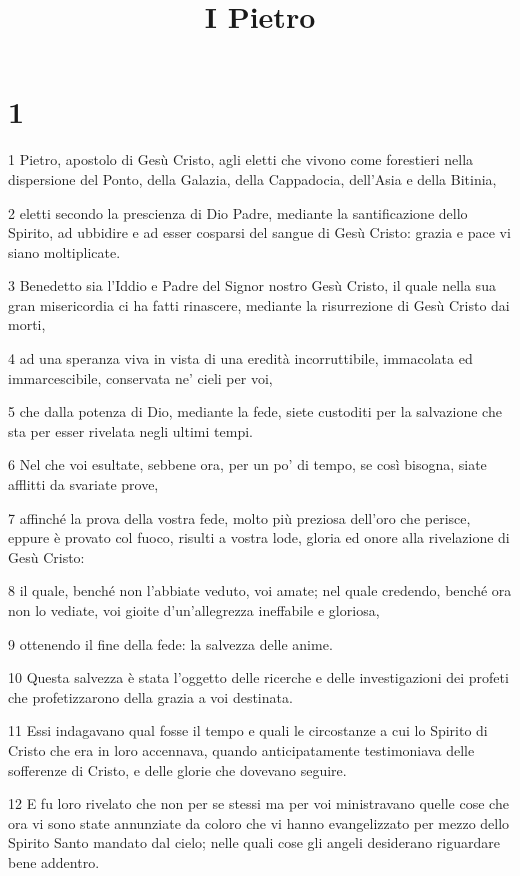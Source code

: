 

\title{I Pietro}


\chapter{1}

\par 1 Pietro, apostolo di Gesù Cristo, agli eletti che vivono come forestieri nella dispersione del Ponto, della Galazia, della Cappadocia, dell'Asia e della Bitinia,
\par 2 eletti secondo la prescienza di Dio Padre, mediante la santificazione dello Spirito, ad ubbidire e ad esser cosparsi del sangue di Gesù Cristo: grazia e pace vi siano moltiplicate.
\par 3 Benedetto sia l'Iddio e Padre del Signor nostro Gesù Cristo, il quale nella sua gran misericordia ci ha fatti rinascere, mediante la risurrezione di Gesù Cristo dai morti,
\par 4 ad una speranza viva in vista di una eredità incorruttibile, immacolata ed immarcescibile, conservata ne' cieli per voi,
\par 5 che dalla potenza di Dio, mediante la fede, siete custoditi per la salvazione che sta per esser rivelata negli ultimi tempi.
\par 6 Nel che voi esultate, sebbene ora, per un po' di tempo, se così bisogna, siate afflitti da svariate prove,
\par 7 affinché la prova della vostra fede, molto più preziosa dell'oro che perisce, eppure è provato col fuoco, risulti a vostra lode, gloria ed onore alla rivelazione di Gesù Cristo:
\par 8 il quale, benché non l'abbiate veduto, voi amate; nel quale credendo, benché ora non lo vediate, voi gioite d'un'allegrezza ineffabile e gloriosa,
\par 9 ottenendo il fine della fede: la salvezza delle anime.
\par 10 Questa salvezza è stata l'oggetto delle ricerche e delle investigazioni dei profeti che profetizzarono della grazia a voi destinata.
\par 11 Essi indagavano qual fosse il tempo e quali le circostanze a cui lo Spirito di Cristo che era in loro accennava, quando anticipatamente testimoniava delle sofferenze di Cristo, e delle glorie che dovevano seguire.
\par 12 E fu loro rivelato che non per se stessi ma per voi ministravano quelle cose che ora vi sono state annunziate da coloro che vi hanno evangelizzato per mezzo dello Spirito Santo mandato dal cielo; nelle quali cose gli angeli desiderano riguardare bene addentro.
